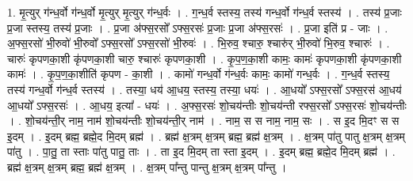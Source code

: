\documentclass[17pt]{extarticle}
\begin{document}
1. मृ॒त्युर् ग॑न्ध॒र्वो ग॑न्ध॒र्वो मृ॒त्युर् मृ॒त्युर् ग॑न्ध॒र्वः । . ग॒न्ध॒र्व स्तस्य॒ तस्य॑ गन्ध॒र्वो ग॑न्ध॒र्व स्तस्य॑ । . तस्य॑ प्र॒जाः प्र॒जा स्तस्य॒ तस्य॑ प्र॒जाः । . प्र॒जा अ॑फ्स॒रसो᳚ ऽफ्स॒रसः॑ प्र॒जाः प्र॒जा अ॑फ्स॒रसः॑ । . प्र॒जा इति॑ प्र - जाः । . अ॒फ्स॒रसो॑ भी॒रुवो॑ भी॒रुवो᳚ ऽफ्स॒रसो᳚ ऽफ्स॒रसो॑ भी॒रुवः॑ । . भि॒रुव॒ श्चारु॒ श्चारु॑र् भी॒रुवो॑ भि॒रुव॒ श्चारुः॑ । . चारुः॑ कृपणका॒शी कृ॑पणका॒शी चारु॒ श्चारुः॑ कृपणका॒शी । . कृ॒प॒ण॒का॒शी कामः॒ कामः॑ कृपणका॒शी कृ॑पणका॒शी कामः॑ । . कृ॒प॒ण॒का॒शीति॑ कृपण - का॒शी । . कामो॑ गन्ध॒र्वो ग॑न्ध॒र्वः कामः॒ कामो॑ गन्ध॒र्वः । . ग॒न्ध॒र्व स्तस्य॒ तस्य॑ गन्ध॒र्वो ग॑न्ध॒र्व स्तस्य॑ । . तस्या॒ धय॑ आ॒धय॒ स्तस्य॒ तस्या॒ धयः॑ । . आ॒धयो᳚ ऽफ्स॒रसो᳚ ऽफ्स॒रस॑ आ॒धय॑ आ॒धयो᳚ ऽफ्स॒रसः॑ । . आ॒धय॒ इत्या᳚ - धयः॑ । . अ॒फ्स॒रसः॑ शो॒चय॑न्तीः शो॒चय॑न्ती रफ्स॒रसो᳚ ऽफ्स॒रसः॑ शो॒चय॑न्तीः । . शो॒चय॑न्ती॒र् नाम॒ नाम॑ शो॒चय॑न्तीः शो॒चय॑न्ती॒र् नाम॑ । . नाम॒ स स नाम॒ नाम॒ सः । . स इ॒द मि॒दꣳ स स इ॒दम् । . इ॒दम् ब्रह्म॒ ब्रह्मे॒द मि॒दम् ब्रह्म॑ । . ब्रह्म॑ क्ष॒त्रम् क्ष॒त्रम् ब्रह्म॒ ब्रह्म॑ क्ष॒त्रम् । . क्ष॒त्रम् पा॑तु पातु क्ष॒त्रम् क्ष॒त्रम् पा॑तु । . पा॒तु॒ ता स्ताः पा॑तु पातु॒ ताः । . ता इ॒द मि॒दम् ता स्ता इ॒दम् । . इ॒दम् ब्रह्म॒ ब्रह्मे॒द मि॒दम् ब्रह्म॑ । . ब्रह्म॑ क्ष॒त्रम् क्ष॒त्रम् ब्रह्म॒ ब्रह्म॑ क्ष॒त्रम् । . क्ष॒त्रम् पा᳚न्तु पान्तु क्ष॒त्रम् क्ष॒त्रम् पा᳚न्तु । \newline
\end{document}

